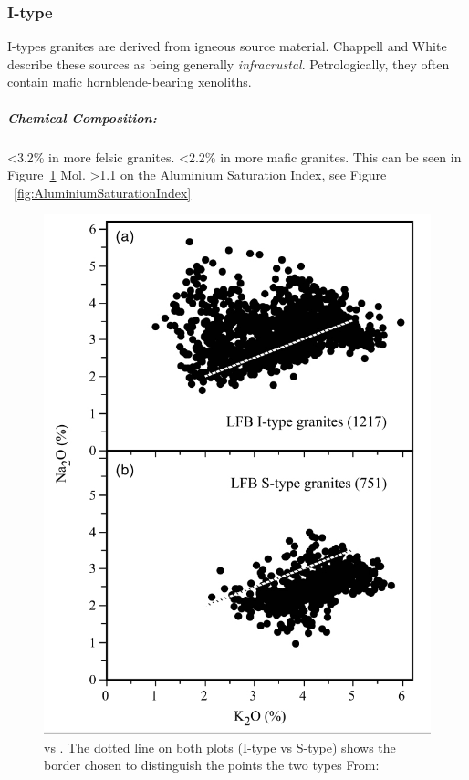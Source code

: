 \documentclass[a4paper]{article}
\begin{document}
\subsubsection{I-type}
I-types granites are derived from igneous source material. Chappell and White describe these sources as being generally \textit{infracrustal}. Petrologically, they often contain mafic hornblende-bearing xenoliths.

\subparagraph{Chemical Composition:}

 \textless 3.2\% in more felsic granites. \newline
{} \textless 2.2\% in more mafic granites. \newline
This can be seen in Figure~\ref{fig:SodiumPotassium}\newline\newline
Mol.  \textgreater 1.1 on the Aluminium Saturation Index, see Figure  ~\ref{fig:AluminiumSaturationIndex} 

\begin{figure}[H]
\centering
\includegraphics[width=1\textwidth]{SodiumPotassium.jpg}
\caption{\label{fig:SodiumPotassium}  vs . The dotted line on both plots (I-type vs S-type) shows the border chosen to distinguish the points the two types  From: \cite{chappell2001two}}
\end{figure}
\end{document}
